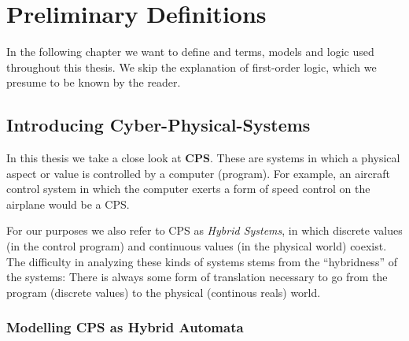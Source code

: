 

\chapter{Preliminary Definitions}
\label{ch:Preliminary}

In the following chapter we want to define and terms, models and logic used throughout this thesis. We skip the explanation of first-order logic, which we presume to be known by the reader.

\section{Introducing Cyber-Physical-Systems}
\label{sec:pre:cps}

In this thesis we take a close look at \textbf{CPS}. These are systems in which a physical aspect or value is controlled by a computer (program). For example, an aircraft control system in which the computer exerts a form of speed control on the airplane would be a CPS. 

For our purposes we also refer to CPS as \textit{Hybrid Systems}, in which discrete values (in the control program) and continuous values (in the physical world) coexist. The difficulty in analyzing these kinds of systems stems from the ``hybridness'' of the systems: There is always some form of translation necessary to go from the program (discrete values) to the physical (continous reals) world. 

\subsection{Modelling CPS as Hybrid Automata}

